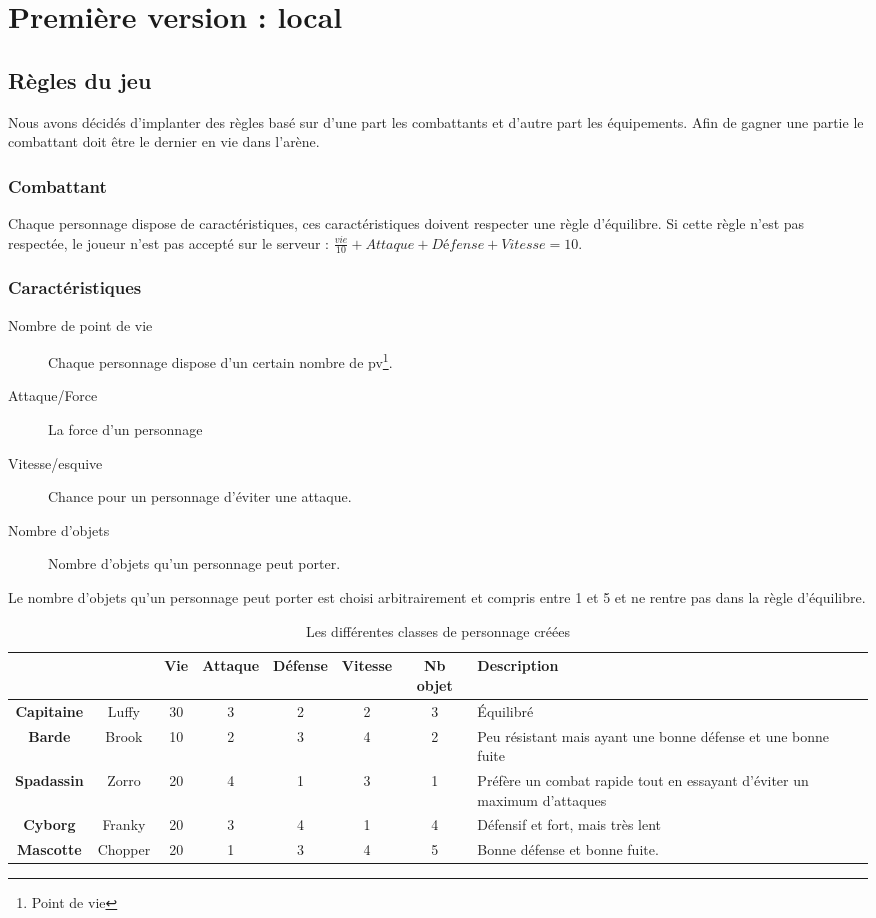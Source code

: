 \documentclass[12pt,a4paper,openany]{book}
\begin{document}
	\chapter{Première version : local}
	\section{Règles du jeu}
	Nous avons décidés d'implanter des règles basé sur d'une part les combattants et d'autre part les équipements. Afin de gagner une partie le combattant doit
	être le dernier en vie dans l'arène.
	\subsection{Combattant}
	Chaque personnage dispose de caractéristiques, ces caractéristiques doivent respecter une règle d'équilibre. Si cette règle n'est pas respectée, le joueur
	n'est pas accepté sur le serveur : $\frac{vie}{10} + Attaque + Défense + Vitesse = 10$.
	\subsection{Caractéristiques}
	\begin{description}
		\item[Nombre de point de vie] Chaque personnage dispose d’un certain nombre de pv\footnote{Point de vie}.
		\item[Attaque/Force] La force d'un personnage 
		\item[Vitesse/esquive] Chance pour un personnage d’éviter une attaque.
		\item[Nombre d'objets] Nombre d’objets qu'un personnage peut porter.
	\end{description}

Le nombre d'objets qu'un personnage peut porter est choisi arbitrairement et compris entre 1 et 5 et ne rentre pas dans la règle d'équilibre.

	 \begin{table}[H]
		 \centering
		 \normalsize
	 \begin{tabular}{cc|cccccp{5.0cm}}
			&&Vie& Attaque & Défense & Vitesse & Nb objet&Description\\
			\hline
			\textbf{Capitaine} & Luffy & 30 & 3 & 2 & 2 & 3& \footnotesize Équilibré\\
			\hline
			\textbf{Barde} & Brook & 10 & 2 & 3 & 4 & 2& \footnotesize Peu résistant mais ayant une bonne défense et une bonne fuite\\
			\hline
			\textbf{Spadassin} & Zorro & 20 & 4 & 1& 3&1& \footnotesize Préfère un combat rapide tout en essayant d'éviter un maximum d'attaques\\
			\hline
			\textbf{Cyborg} & Franky & 20 & 3 & 4 & 1& 4 & \footnotesize Défensif et fort, mais très lent\\
			\hline
			\textbf{Mascotte} & Chopper&20&1&3&4&5& \footnotesize Bonne défense et bonne fuite. \\
			\hline
		\end{tabular}
		\caption{Les différentes classes de personnage créées}
	\end{table}
\end{document}
